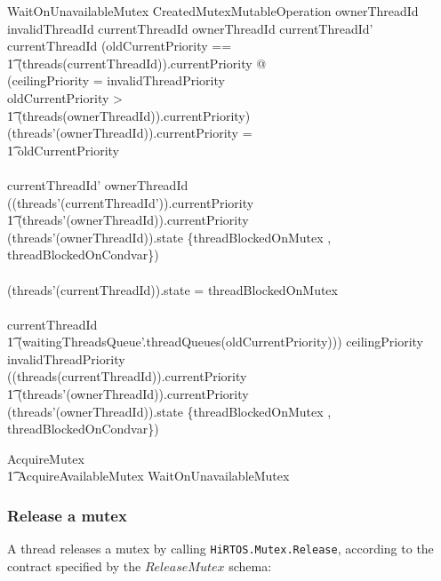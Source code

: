 \documentclass[11pt,letterpaper,twoside,openany]{book}
\begin{document}
\begin{schema}{WaitOnUnavailableMutex}
   CreatedMutexMutableOperation
\where
   ownerThreadId \neq invalidThreadId
\also
   currentThreadId \neq ownerThreadId
\also
   currentThreadId' \neq currentThreadId
\also
(\LET oldCurrentPriority == \\
\t1 (threads(currentThreadId)).currentPriority @ \\
(ceilingPriority = invalidThreadPriority \land \\
 oldCurrentPriority > \\
 \t1 (threads(ownerThreadId)).currentPriority) \implies \\
 (threads'(ownerThreadId)).currentPriority = \\
 \t1 oldCurrentPriority \\
\land \\
 currentThreadId' \neq ownerThreadId \implies \\
 ((threads'(currentThreadId')).currentPriority \geq \\
 \t1 (threads'(ownerThreadId)).currentPriority \lor \\
 (threads'(ownerThreadId)).state \in  \{threadBlockedOnMutex , threadBlockedOnCondvar\}) \\
\land \\
 (threads'(currentThreadId)).state = threadBlockedOnMutex \\
\land \\
currentThreadId \in \\
\t1 \ran (waitingThreadsQueue'.threadQueues(oldCurrentPriority)))
\also
ceilingPriority \neq invalidThreadPriority \implies \\
((threads(currentThreadId)).currentPriority \leq \\
 \t1 (threads'(ownerThreadId)).currentPriority \land \\
 (threads'(ownerThreadId)).state \in \{threadBlockedOnMutex , threadBlockedOnCondvar\})
\end{schema}

\begin{zed}
   AcquireMutex  \\
   \t1 AcquireAvailableMutex \lor WaitOnUnavailableMutex
\end{zed}

\subsubsection{Release a mutex}

A thread releases a mutex by calling \verb`HiRTOS.Mutex.Release`, according to the contract
specified by the $ReleaseMutex$ schema:
\end{document}
